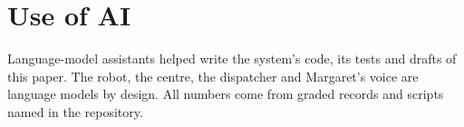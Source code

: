 \documentclass[10pt,twocolumn]{article}
\begin{document}
\section*{Use of AI}
Language-model assistants helped write the system's code, its tests and drafts of this paper. The
robot, the centre, the dispatcher and Margaret's voice are language models by design. All numbers
come from graded records and scripts named in the repository.



\end{document}
